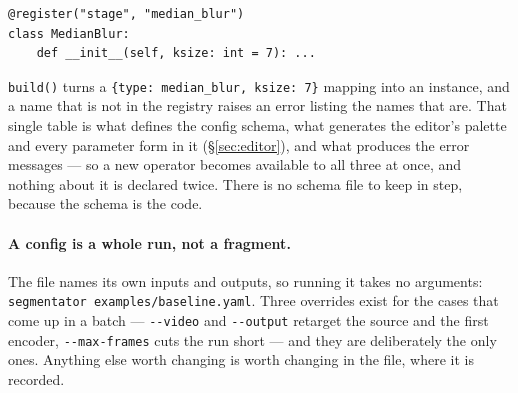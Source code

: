 \begin{lstlisting}[style=yaml, basicstyle=\ttfamily\small\color{ink}]
@register("stage", "median_blur")
class MedianBlur:
    def __init__(self, ksize: int = 7): ...
\end{lstlisting}

\noindent
\texttt{build()} turns a \texttt{\{type: median\_blur, ksize: 7\}} mapping into
an instance, and a name that is not in the registry raises an error listing the
names that are. That single table is what defines the config schema, what
generates the editor's palette and every parameter form in it (§\ref{sec:editor}),
and what produces the error messages --- so a new operator becomes available to
all three at once, and nothing about it is declared twice. There is no schema
file to keep in step, because the schema is the code.

\paragraph{A config is a whole run, not a fragment.} The file names its own
inputs and outputs, so running it takes no arguments:
\texttt{segmentator examples/baseline.yaml}. Three overrides exist for the cases
that come up in a batch --- \texttt{-{}-video} and \texttt{-{}-output} retarget
the source and the first encoder, \texttt{-{}-max-frames} cuts the run short ---
and they are deliberately the only ones. Anything else worth changing is worth
changing in the file, where it is recorded.
